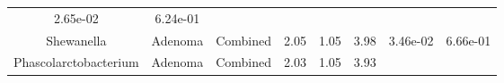 \documentclass[12pt,]{article}
\begin{document}
\begin{longtable}[]{@{}cccccccc@{}}
\begin{minipage}[t]{0.06\columnwidth}
2.65e-02\strut
\end{minipage} & \begin{minipage}[t]{0.06\columnwidth}\centering\strut
6.24e-01\strut
\end{minipage}\tabularnewline
\begin{minipage}[t]{0.18\columnwidth}\centering\strut
Shewanella\strut
\end{minipage} & \begin{minipage}[t]{0.07\columnwidth}\centering\strut
Adenoma\strut
\end{minipage} & \begin{minipage}[t]{0.09\columnwidth}\centering\strut
Combined\strut
\end{minipage} & \begin{minipage}[t]{0.03\columnwidth}\centering\strut
2.05\strut
\end{minipage} & \begin{minipage}[t]{0.14\columnwidth}\centering\strut
1.05\strut
\end{minipage} & \begin{minipage}[t]{0.14\columnwidth}\centering\strut
3.98\strut
\end{minipage} & \begin{minipage}[t]{0.06\columnwidth}\centering\strut
3.46e-02\strut
\end{minipage} & \begin{minipage}[t]{0.06\columnwidth}\centering\strut
6.66e-01\strut
\end{minipage}\tabularnewline
\begin{minipage}[t]{0.18\columnwidth}\centering\strut
Phascolarctobacterium\strut
\end{minipage} & \begin{minipage}[t]{0.07\columnwidth}\centering\strut
Adenoma\strut
\end{minipage} & \begin{minipage}[t]{0.09\columnwidth}\centering\strut
Combined\strut
\end{minipage} & \begin{minipage}[t]{0.03\columnwidth}\centering\strut
2.03\strut
\end{minipage} & \begin{minipage}[t]{0.14\columnwidth}\centering\strut
1.05\strut
\end{minipage} & \begin{minipage}[t]{0.14\columnwidth}\centering\strut
3.93\strut
\end{minipage} & \begin{minipage}[t]{0.06\columnwidth}\centering\strut

\end{minipage}
\end{longtable}
\end{document}
